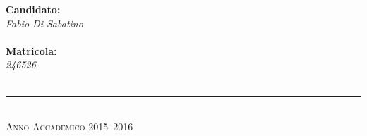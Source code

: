 \begin{titlepage}
\begin{center}
{%
\hspace*{0.1\textwidth}

\begin{minipage}[t]{0.4\textwidth}
\centering
{\bfseries Candidato:} \\
{\itshape Fabio Di Sabatino} \\
\bigskip
\underline{\hspace{\textwidth}}
\\
\bigskip \bigskip
{\bfseries Matricola:} \\
{\itshape 246526} \\
\bigskip
\underline{\hspace{\textwidth}}
\\
\end{minipage}

}

\vfil \vfil \vfil

\rule{\textwidth}{1pt}\\
{\scshape Anno Accademico 2015--2016}

\end{center}

\end{titlepage}

